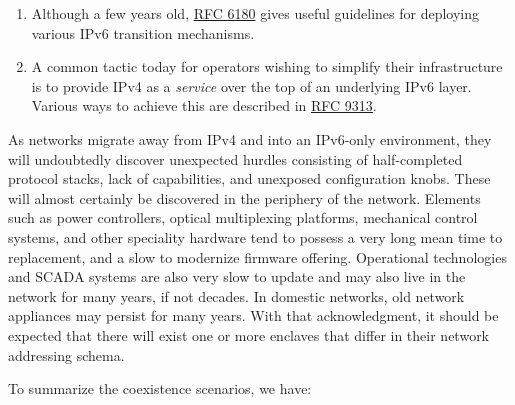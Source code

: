 \documentclass[
]{article}
\begin{document}
\begin{enumerate}
\def\labelenumi{\arabic{enumi}.}
\item
  Although a few years old,
  \href{https://www.rfc-editor.org/info/rfc6180}{RFC 6180} gives useful
  guidelines for deploying various IPv6 transition mechanisms.
\item
  A common tactic today for operators wishing to simplify their
  infrastructure is to provide IPv4 as a \emph{service} over the top of
  an underlying IPv6 layer. Various ways to achieve this are described
  in \href{https://www.rfc-editor.org/info/rfc9313}{RFC 9313}.
\end{enumerate}

As networks migrate away from IPv4 and into an IPv6-only environment,
they will undoubtedly discover unexpected hurdles consisting of
half-completed protocol stacks, lack of capabilities, and unexposed
configuration knobs. These will almost certainly be discovered in the
periphery of the network. Elements such as power controllers, optical
multiplexing platforms, mechanical control systems, and other speciality
hardware tend to possess a very long mean time to replacement, and a
slow to modernize firmware offering. Operational technologies and SCADA
systems are also very slow to update and may also live in the network
for many years, if not decades. In domestic networks, old network
appliances may persist for many years. With that acknowledgment, it
should be expected that there will exist one or more enclaves that
differ in their network addressing schema.

To summarize the coexistence scenarios, we have:
\end{document}
